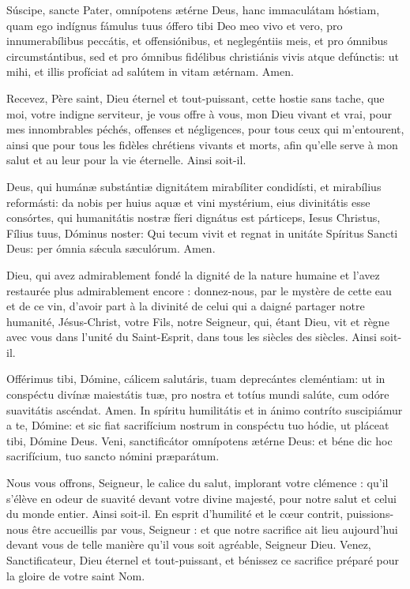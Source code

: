 \documentclass[twoside]{article}
\begin{document}
\begin{paracol}{2}

Súscipe, sancte Pater, omnípotens ætérne Deus, hanc immaculátam hóstiam, quam ego indígnus fámulus tuus óffero tibi Deo meo vivo et vero, pro innumerabílibus peccátis, et offensiónibus, et neglegéntiis meis, et pro ómnibus circumstántibus, sed et pro ómnibus fidélibus christiánis vivis atque defúnctis: ut mihi, et illis profíciat ad salútem in vitam ætérnam. Amen.

\switchcolumn

Recevez, Père saint, Dieu éternel et tout-puissant, cette hostie sans tache, que moi, votre indigne serviteur, je vous offre à vous, mon Dieu vivant et vrai, pour mes innombrables péchés, offenses et négligences, pour tous ceux qui m’entourent, ainsi que pour tous les ﬁdèles chrétiens vivants et morts, aﬁn qu’elle serve à mon salut et au leur pour la vie éternelle. Ainsi soit-il.

\switchcolumn*

Deus, qui humánæ substántiæ dignitátem mirabíliter condidísti, et mirabílius reformásti: da nobis per huius aquæ et vini mystérium, eius divinitátis esse consórtes, qui humanitátis nostræ fíeri dignátus est párticeps, Iesus Christus, Fílius tuus, Dóminus noster: Qui tecum vivit et regnat in unitáte Spíritus Sancti Deus: per ómnia sǽcula sæculórum. Amen.

\switchcolumn

Dieu, qui avez admirablement fondé la dignité de la nature humaine et l’avez restaurée plus admirablement encore : donnez-nous, par le mystère de cette eau et de ce vin, d’avoir part à la divinité de celui qui a daigné partager notre humanité, Jésus-Christ, votre Fils, notre Seigneur, qui, étant Dieu, vit et règne avec vous dans l’unité du Saint-Esprit, dans tous les siècles des siècles. Ainsi soit-il.

\switchcolumn*

Offérimus tibi, Dómine, cálicem salutáris, tuam deprecántes cleméntiam: ut in conspéctu divínæ maiestátis tuæ, pro nostra et totíus mundi salúte, cum odóre suavitátis ascéndat. Amen.
In spíritu humilitátis et in ánimo contríto suscipiámur a te, Dómine: et sic fiat sacrifícium nostrum in conspéctu tuo hódie, ut pláceat tibi, Dómine Deus.
Veni, sanctificátor omnípotens ætérne Deus: et béne dic hoc sacrifícium, tuo sancto nómini præparátum.

\switchcolumn

Nous vous offrons, Seigneur, le calice du salut, implorant votre clémence : qu’il s’élève en odeur de suavité devant votre divine majesté, pour notre salut et celui du monde entier. Ainsi soit-il.
En esprit d’humilité et le cœur contrit, puissions-nous être accueillis par vous, Seigneur : et que notre sacriﬁce ait lieu aujourd’hui devant vous de telle manière qu’il vous soit agréable, Seigneur Dieu.
Venez, Sanctiﬁcateur, Dieu éternel et tout-puissant, et bénissez ce sacriﬁce préparé pour la gloire de votre saint Nom.


\end{paracol}
\end{document}
